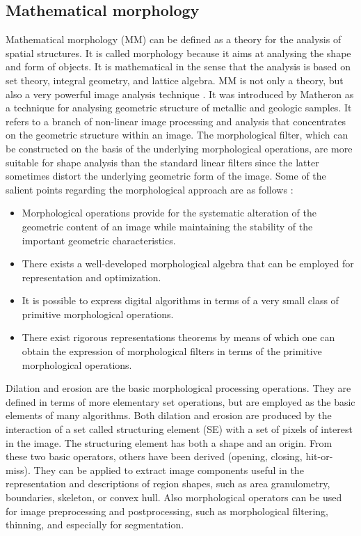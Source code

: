 \documentclass[sensors,review,submit,moreauthors,pdftex,10pt,a4paper]{mdpi}
\begin{document}
	\subsection{Mathematical morphology}
	Mathematical morphology (MM) can be defined as a theory for the analysis of spatial structures. It is called morphology because it aims at analysing the shape and form of objects. It is mathematical in the sense that the analysis is based on set theory, integral geometry, and lattice algebra. MM is not only a theory, but also a very powerful image analysis technique \cite{Soille2004}.
	It was introduced by Matheron as a technique for analysing geometric structure of metallic and geologic samples. It refers to a branch of non-linear image processing and analysis that concentrates on the geometric structure within an image.
	The morphological filter, which can be constructed on the basis of the underlying morphological operations, are more suitable for shape analysis than the standard linear filters since the latter sometimes distort the underlying geometric form of the image. Some of the salient points regarding the morphological approach are as follows \cite{Giardina1988}:
	\begin{itemize}[leftmargin=*,labelsep=5.8mm]
		\item Morphological operations provide for the systematic alteration of the geometric content of an image while maintaining the stability of the important geometric characteristics.
		\item There exists a well-developed morphological algebra that can be employed for representation and optimization.
		\item It is possible to express digital algorithms in terms of a very small class of primitive morphological operations.
		\item There exist rigorous representations theorems by means of which one can obtain the expression of morphological filters in terms of the primitive morphological operations.
	\end{itemize}
	Dilation and erosion are the basic morphological processing operations. They are defined in terms of more elementary set operations, but are employed as the basic elements of many algorithms. Both dilation and erosion are produced by the interaction of a set called structuring element (SE) with a set of pixels of interest in the image. The structuring element has both a shape and an origin. From these two basic operators, others have been derived (opening, closing, hit-or-miss). They can be applied to extract image components useful in the representation and descriptions of region shapes, such as area granulometry, boundaries, skeleton, or convex hull. Also morphological operators can be used for image preprocessing and postprocessing, such as morphological filtering, thinning, and especially for segmentation.
	
\end{document}
